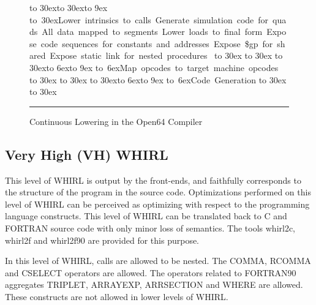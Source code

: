 \documentclass{article}
\begin{document}
\begin{figure}
{{\hbox to 30ex{\vbox to 30ex{\vfil\figdownarrow{30ex}\vfil}\hbox to 9ex{\hfil}%
\hbox{\vbox to 30ex{\vfil\hbox{Lower intrinsics to calls}
      \hbox{Generate simulation code for quads}
      \hbox{All data mapped to segments}
      \hbox{Lower loads to final form}
      \hbox{Expose code sequences for}
      \hbox{\quad{}constants and addresses}
      \hbox{Expose \$gp for shared}
      \hbox{Expose static link for nested}
      \hbox{\quad{}procedures}
      \vfil
}}\hss}
\hbox to 30ex{
%
\hbox to 30ex{\hfil{}\hfil}}
\hbox to 30ex{\vbox to 6ex{\vfil\figdownarrow{30ex}\vfil}\hbox to 9ex{\hfil}%
\hbox{\vbox to 6ex{\vfil\hbox{Map opcodes to target machine}
      \hbox{\quad{}opcodes}
      \vfil
}}\hss}
\hbox to 30ex{
%
\hbox to 30ex{\hfil{}\hfil}}
\hbox to 30ex{\vbox to 6ex{\vfil\figdownarrow{30ex}\vfil}\hbox to 9ex{\hfil}%
\hbox{\vbox to 6ex{\vfil\hbox{Code Generation}\vfil}}\hss}
\hbox to 30ex{
%
\hbox to 30ex{\hfil{}\hfil}
}}
\hfil
}

\vspace{.5in}

\hrule
\caption{Continuous Lowering in the Open64 Compiler}
\end{figure}

\subsection{Very High (VH) WHIRL}

This level of WHIRL is output by the front-ends, and faithfully
corresponds to the structure of the program in the source code.
Optimizations performed on this level of WHIRL can be perceived as optimizing
with respect to the programming language constructs. This level of
WHIRL can be translated back to C and FORTRAN source code with only
minor loss of semantics. The tools whirl2c, whirl2f and whirl2f90
are provided for this purpose. 

In this level of WHIRL, calls are
allowed to be nested. The
%
COMMA,
%
RCOMMA and
%
CSELECT operators are
allowed. The operators related to FORTRAN90 aggregates
%
TRIPLET,
%
ARRAYEXP,
%
ARRSECTION and 
%
WHERE are allowed. These constructs
are not allowed in lower levels of WHIRL.
\end{document}
